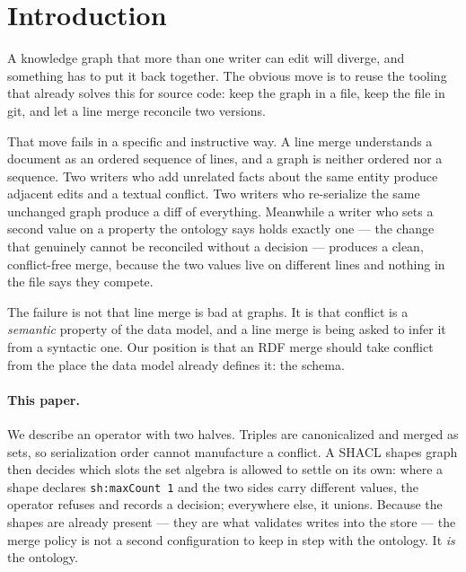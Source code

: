 \section{Introduction}

A knowledge graph that more than one writer can edit will diverge, and something
has to put it back together. The obvious move is to reuse the tooling that
already solves this for source code: keep the graph in a file, keep the file in
git, and let a line merge reconcile two versions.

That move fails in a specific and instructive way. A line merge understands a
document as an ordered sequence of lines, and a graph is neither ordered nor a
sequence. Two writers who add unrelated facts about the same entity produce
adjacent edits and a textual conflict. Two writers who re-serialize the same
unchanged graph produce a diff of everything. Meanwhile a writer who sets a
second value on a property the ontology says holds exactly one --- the change
that genuinely cannot be reconciled without a decision --- produces a clean,
conflict-free merge, because the two values live on different lines and nothing
in the file says they compete.

The failure is not that line merge is bad at graphs. It is that conflict is a
\emph{semantic} property of the data model, and a line merge is being asked to
infer it from a syntactic one. Our position is that an RDF merge should take
conflict from the place the data model already defines it: the schema.

\paragraph{This paper.} We describe an operator with two halves. Triples are
canonicalized and merged as sets, so serialization order cannot manufacture a
conflict. A SHACL shapes graph then decides which slots the set algebra is
allowed to settle on its own: where a shape declares \texttt{sh:maxCount 1} and
the two sides carry different values, the operator refuses and records a
decision; everywhere else, it unions. Because the shapes are already present ---
they are what validates writes into the store --- the merge policy is not a
second configuration to keep in step with the ontology. It \emph{is} the
ontology.

